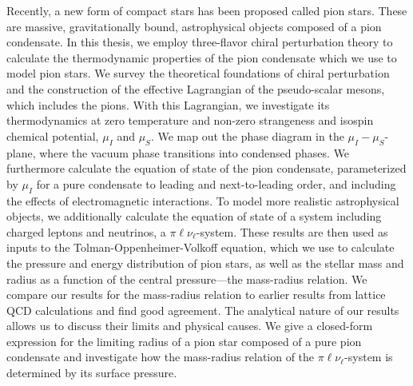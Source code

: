 Recently, a new form of compact stars has been proposed called pion stars.
These are massive, gravitationally bound, astrophysical objects composed of a pion condensate.
In this thesis, we employ three-flavor chiral perturbation theory to calculate the thermodynamic properties of the pion condensate which we use to model pion stars.
We survey the theoretical foundations of chiral perturbation and the construction of the effective Lagrangian of the pseudo-scalar mesons, which includes the pions.
With this Lagrangian, we investigate its thermodynamics at zero temperature and non-zero strangeness and isospin chemical potential, $\mu_I$ and $\mu_S$.
We map out the phase diagram in the $\mu_I-\mu_S$-plane, where the vacuum phase transitions into condensed phases.
We furthermore calculate the equation of state of the pion condensate, parameterized by $\mu_I$ for a pure condensate to leading and next-to-leading order, and including the effects of electromagnetic interactions.
To model more realistic astrophysical objects, we additionally calculate the equation of state of a system including charged leptons and neutrinos, a $\pi\ell\nu_\ell$-system.
These results are then used as inputs to the Tolman-Oppenheimer-Volkoff equation, which we use to calculate the pressure and energy distribution of pion stars, as well as the stellar mass and radius as a function of the central pressure---the mass-radius relation.
We compare our results for the mass-radius relation to earlier results from lattice QCD calculations and find good agreement.
The analytical nature of our results allows us to discuss their limits and physical causes.
We give a closed-form expression for the limiting radius of a pion star composed of a pure pion condensate and investigate how the mass-radius relation of the $\pi\ell\nu_\ell$-system is determined by its surface pressure.


